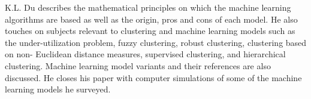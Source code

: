 \documentclass[../main]{subfiles}
\begin{document}
K.L. Du describes the mathematical principles on which the machine learning algorithms are based as well as the origin, pros and cons of each model.
\newline
He also touches on subjects relevant to clustering and machine learning models such as the under-utilization problem, fuzzy clustering, robust clustering, clustering based on non- Euclidean distance measures, supervised clustering, and hierarchical clustering.
Machine learning model variants and their references are also discussed.
\newline
He closes his paper with computer simulations of some of the machine learning models he surveyed.
\end{document}
